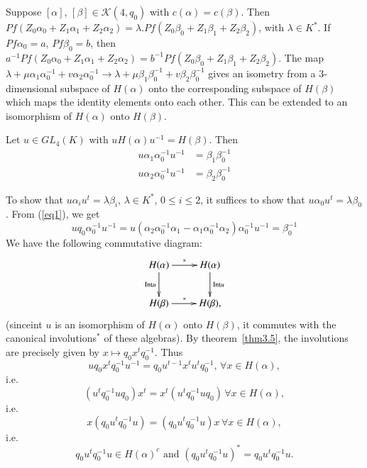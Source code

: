 \begin{Proof}
Suppose $[\alpha]$, $[\beta]\in \mathscr{K}(4,q_0)$ with $c(\alpha)=c(\beta)$. Then $Pf(Z_0\alpha_0+Z_1\alpha_1+Z_2\alpha_2)=\lambda. Pf(Z_0\beta_0+Z_1\beta_1+Z_2\beta_2)$, with $\lambda \in K^{\ast}$. If $Pf\alpha_0=a$, $Pf\beta_0=b$, then $a^{-1}Pf(Z_0\alpha_0+Z_1\alpha_1+Z_2\alpha_2)=b^{-1}Pf(Z_0\beta_0+Z_1\beta_1+Z_2\beta_2)$. The map $\lambda +\mu \alpha_1\alpha_0^{-1}+v\alpha_2\alpha_0^{-1}\to \lambda +\mu \beta_1\beta^{-1}_0+v\beta_2\beta_0^{-1}$ gives an isometry from a $3$-dimensional subspace of $H(\alpha)$ onto the corresponding subspace of $H(\beta)$ which maps the identity elements onto each other. This can be extended to an isomorphism of $H(\alpha)$ onto $H(\beta)$. 

Let $u\in GL_4(K)$ with $uH(\alpha)u^{-1}=H(\beta)$. Then 
\begin{equation*}\label{eq1}
\begin{aligned}
u\alpha_1\alpha^{-1}_0 u^{-1}&=\beta_1\beta^{-1}_0\\
u \alpha_2\alpha^{-1}_0u^{-1}&=\beta_2\beta_0^{-1}
\end{aligned}\tag{1}
\end{equation*}

To show that $u\alpha_i u^{t}=\lambda \beta_i$, $\lambda \in K^{\ast}$, $0\leq i \leq 2$, it suffices to show that $u\alpha_0 u^{t}=\lambda \beta_0$. From (\ref{eq1}), we get 
\begin{equation*}\label{eq2}
u q_0\alpha^{-1}_0u^{-1}=u\left(\alpha_2\alpha_0^{-1}\alpha_1-\alpha_1\alpha_0^{-1}\alpha_2\right)\alpha^{-1}_0 u^{-1}=\beta^{-1}_0\tag{2}
\end{equation*}
We have the following commutative diagram: 
$$
\xymatrix{H(\alpha)\ar[d]_{\Int u}\ar[r]^{\ast}&H(\alpha)\ar[d]^{\Int u}\\
H(\beta)\ar[r]^{\ast}& H(\beta),}
$$
(since\pageoriginale int $u$ is an isomorphism of $H(\alpha)$ onto $H(\beta)$, it commutes with the canonical involutions$^{\ast}$ of these algebras). By theorem~\ref{thm3.5}, the involutions are precisely given by $x\mapsto q_0 x^{t}q_0^{-1}$. Thus 
$$
u q_0 x^{t} q^{-1}_0 u^{-1}=q_0 u^{t-1} x^{t} u^{t} q^{-1}_0,\, \forall x \in H(\alpha),
$$
i.e.
$$
\left(u^{t} q^{-1}_0 u q_0\right) x^{t}=x^{t}\left(u^{t}q^{-1}_0 u q_0\right)\, \forall x \in H(\alpha), 
$$
i.e.
$$
x\left(q_0 u^{t}q^{-1}_0 u\right)=\left(q_0 u^{t} q^{-1}_0 u\right)x\, \forall x\in H(\alpha), 
$$
i.e.
$$
q_0u^{t}q^{-1}_0u\in H(\alpha)^{c} \text{ and } \left(q_0 u^{t} q^{-1}_0 u\right)^{\ast}=q_0 u^{t} q^{-1}_0 u.
$$


\end{Proof}
